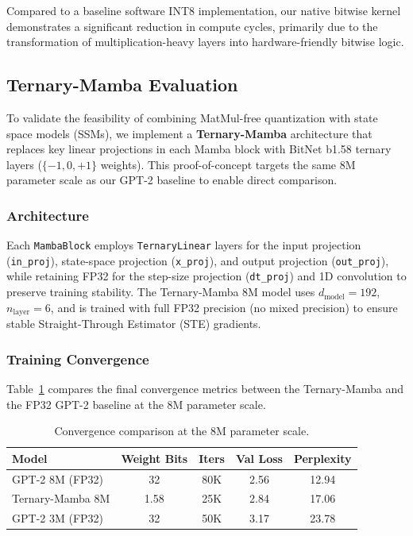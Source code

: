 Compared to a baseline software INT8 implementation, our native bitwise kernel
    demonstrates a significant reduction in compute cycles, primarily due to 
    the transformation of multiplication-heavy layers into hardware-friendly 
    bitwise logic.

\subsection{Ternary-Mamba Evaluation}
\label{sec:ternary_mamba_eval}

To validate the feasibility of combining MatMul-free quantization with state space models (SSMs), we implement a \textbf{Ternary-Mamba} architecture that replaces key linear projections in each Mamba block with BitNet b1.58 ternary layers ($\{-1, 0, +1\}$ weights). This proof-of-concept targets the same 8M parameter scale as our GPT-2 baseline to enable direct comparison.

\subsubsection{Architecture}

Each \texttt{MambaBlock} employs \texttt{TernaryLinear} layers for the input projection (\texttt{in\_proj}), state-space projection (\texttt{x\_proj}), and output projection (\texttt{out\_proj}), while retaining FP32 for the step-size projection (\texttt{dt\_proj}) and 1D convolution to preserve training stability. The Ternary-Mamba 8M model uses $d_{\text{model}} = 192$, $n_{\text{layer}} = 6$, and is trained with full FP32 precision (no mixed precision) to ensure stable Straight-Through Estimator (STE) gradients.

\subsubsection{Training Convergence}

Table~\ref{tab:ternary_comparison} compares the final convergence metrics between the Ternary-Mamba and the FP32 GPT-2 baseline at the 8M parameter scale.

\begin{table}[H]
\centering
\caption{Convergence comparison at the 8M parameter scale.}
\label{tab:ternary_comparison}
\small
\begin{tabular}{lcccc}
\toprule
\textbf{Model} & \textbf{Weight Bits} & \textbf{Iters} & \textbf{Val Loss} & \textbf{Perplexity} \\
\midrule
GPT-2 8M (FP32)        & 32   & 80K  & 2.56 & 12.94 \\
Ternary-Mamba 8M        & 1.58 & 25K  & 2.84 & 17.06 \\
GPT-2 3M (FP32)         & 32   & 50K  & 3.17 & 23.78 \\
\bottomrule
\end{tabular}
\end{table}

